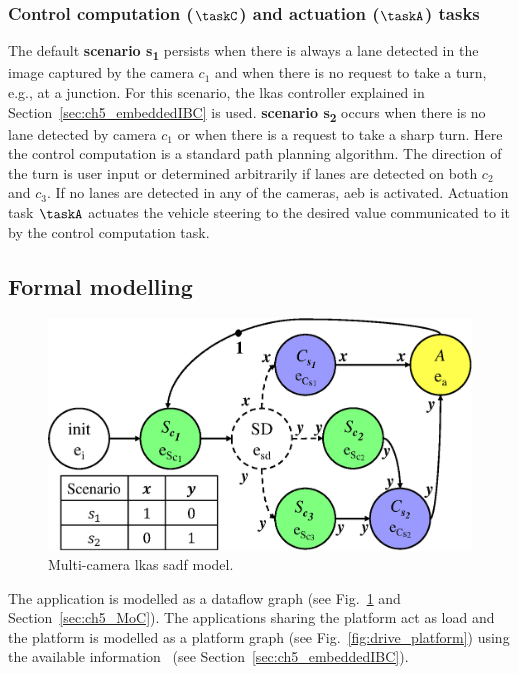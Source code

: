 \subsubsection{Control computation ($\taskC$) and actuation ($\taskA$) tasks} 
The default \textbf{scenario {s\textsubscript{1}}} 
persists when there is always a lane detected in the image captured by the camera $c_1$ and when there is no request to take a turn, e.g., at a junction. For this scenario, the \gls{lkas} controller explained in Section~\ref{sec:ch5_embeddedIBC} is used. 
\textbf{scenario {s\textsubscript{2}}} occurs when there is no lane detected by camera $c_1$ or when there is a request to take a sharp turn. Here the control computation is a standard path planning algorithm. The direction of the turn is user input or determined arbitrarily if lanes are detected on both $c_2$ and $c_3$. If no lanes are detected in any of the cameras, \gls{aeb} is activated.
Actuation task $\taskA$ actuates the vehicle steering to the desired value communicated to it by the control computation task.

\subsection{Formal modelling}
\begin{figure}[t]
    \centering
    \includegraphics[scale=0.5]{images/sadf2.eps}
    \caption{Multi-camera \gls{lkas} \gls{sadf} model.}
    \label{fig:ch5_SADF2}
\end{figure}
The application is modelled as a dataflow graph (see Fig.~\ref{fig:ch5_SADF2} and Section~\ref{sec:ch5_MoC}). The applications sharing the platform act as load and the platform is modelled as a platform graph (see Fig.~\ref{fig:drive_platform}) using the available information~\cite{nvidiadrive} (see Section~\ref{sec:ch5_embeddedIBC}). 

